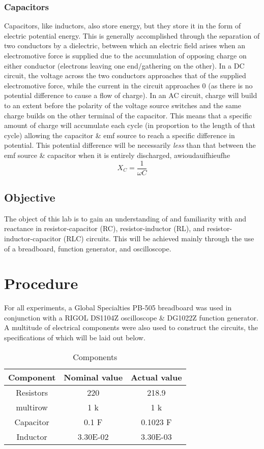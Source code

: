 \documentclass{article}
\begin{document}
			\subsubsection*{Capacitors}
				Capacitors, like inductors, also store energy, but they store it in the form of electric potential energy. This is generally accomplished through the separation of two conductors by a dielectric, between which an electric field arises when an electromotive force is supplied due to the accumulation of opposing charge on either conductor (electrons leaving one end/gathering on the other).
				In a DC circuit, the voltage across the two conductors approaches that of the supplied electromotive force, while the current in the circuit approaches 0 (as there is no potential difference to cause a flow of charge).
				In an AC circuit, charge will build to an extent before the polarity of the voltage source switches and the same charge builds on the other terminal of the capacitor. This means that a specific amount of charge will accumulate each cycle (in proportion to the length of that cycle) allowing the capacitor \& emf source to reach a specific difference in potential. This potential difference will be necessarily \emph{less} than that between the emf source \& capacitor when it is entirely discharged, awioudauifhieufhe
				$$ X_C = \frac{1}{\omega C} $$


		\subsection{Objective}
			The object of this lab is to gain an understanding of and familiarity with and reactance in resistor-capacitor (RC), resistor-inductor (RL), and resistor-inductor-capacitor (RLC) circuits. This will be achieved mainly through the use of a breadboard, function generator, and oscilloscope.

	\section{Procedure}
		For all experiments, a Global Specialties PB-505 breadboard was used in conjunction with a RIGOL DS1104Z oscilloscope \& DG1022Z function generator. A multitude of electrical components were also used to construct the circuits, the specifications of which will be laid out below.
		\begin{table}[htbp]
	\centering
	\caption{Components}
	\begin{tabular}{ccc}
		\hline
		Component & Nominal value & Actual value \\ \hline
		Resistors & 220 \textOmega & 218.9  \textpm \textOmega \\
		multirow & 1 k\textOmega & 1 \textpm k\textOmega \\
		Capacitor & 0.1 \textmu F & 0.1023 \textpm \textmu F \\
		Inductor & 3.30E-02 & 3.30E-03 \\ \hline
	\end{tabular}
\end{table}
\end{document}
